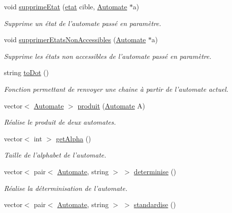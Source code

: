 \begin{DoxyCompactItemize}
void \hyperlink{class_automate_a5d258956a3a0a655cf0e2ac233156651}{supprime\-Etat} (\hyperlink{classetat}{etat} cible, \hyperlink{class_automate}{Automate} $\ast$a)
\begin{DoxyCompactList}\small\item\em Supprime un état de l'automate passé en paramètre. \end{DoxyCompactList}\item 
void \hyperlink{class_automate_ac808d99ac1a43b37e5e7ffc95c54cd40}{supprimer\-Etats\-Non\-Accessibles} (\hyperlink{class_automate}{Automate} $\ast$a)
\begin{DoxyCompactList}\small\item\em Supprime les états non accessibles de l'automate passé en paramètre. \end{DoxyCompactList}\item 
string \hyperlink{class_automate_af1f2f1cd64780ff7b302936787aeac38}{to\-Dot} ()
\begin{DoxyCompactList}\small\item\em Fonction permettant de renvoyer une chaine à partir de l'automate actuel. \end{DoxyCompactList}\item 
vector$<$ \hyperlink{class_automate}{Automate} $>$ \hyperlink{class_automate_a0e2d212ace9f993021c9112aa99b7aed}{produit} (\hyperlink{class_automate}{Automate} A)
\begin{DoxyCompactList}\small\item\em Réalise le produit de deux automates. \end{DoxyCompactList}\item 
vector$<$ int $>$ \hyperlink{class_automate_ab18acfedc3d9704ab08d8fd464efccfe}{get\-Alpha} ()
\begin{DoxyCompactList}\small\item\em Taille de l'alphabet de l'automate. \end{DoxyCompactList}\item 
vector$<$ pair$<$ \hyperlink{class_automate}{Automate}, string $>$ $>$ \hyperlink{class_automate_aa1829f8d4512f67d4e3efb945cc550f0}{determinise} ()
\begin{DoxyCompactList}\small\item\em Réalise la déterminisation de l'automate. \end{DoxyCompactList}\item 
vector$<$ pair$<$ \hyperlink{class_automate}{Automate}, string $>$ $>$ \hyperlink{class_automate_a32ec8c518bd5d988ac10544b13c0bb95}{standardise} ()

\end{DoxyCompactItemize}

